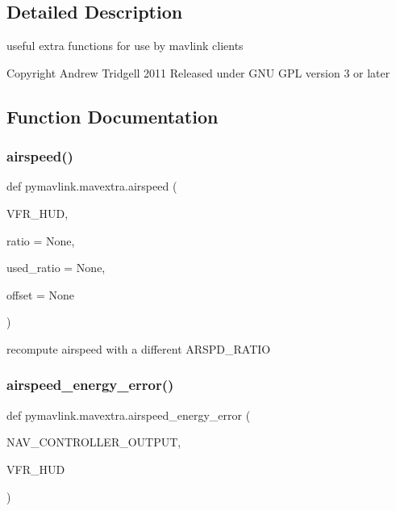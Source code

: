 \subsection{Detailed Description}
\begin{DoxyVerb}useful extra functions for use by mavlink clients

Copyright Andrew Tridgell 2011
Released under GNU GPL version 3 or later
\end{DoxyVerb}
 

\subsection{Function Documentation}
\mbox{\label{namespacepymavlink_1_1mavextra_a769a373b481f0c8aa24565a18f141e66}} 
\subsubsection{\texorpdfstring{airspeed()}{airspeed()}}
{\footnotesize\ttfamily def pymavlink.\+mavextra.\+airspeed (\begin{DoxyParamCaption}\item[{}]{V\+F\+R\+\_\+\+H\+UD,  }\item[{}]{ratio = {\ttfamily None},  }\item[{}]{used\+\_\+ratio = {\ttfamily None},  }\item[{}]{offset = {\ttfamily None} }\end{DoxyParamCaption})}

\begin{DoxyVerb}recompute airspeed with a different ARSPD_RATIO\end{DoxyVerb}
 \mbox{\label{namespacepymavlink_1_1mavextra_ac195697770b7a0067e109293778a73e1}} 
\subsubsection{\texorpdfstring{airspeed\+\_\+energy\+\_\+error()}{airspeed\_energy\_error()}}
{\footnotesize\ttfamily def pymavlink.\+mavextra.\+airspeed\+\_\+energy\+\_\+error (\begin{DoxyParamCaption}\item[{}]{N\+A\+V\+\_\+\+C\+O\+N\+T\+R\+O\+L\+L\+E\+R\+\_\+\+O\+U\+T\+P\+UT,  }\item[{}]{V\+F\+R\+\_\+\+H\+UD }\end{DoxyParamCaption})}

